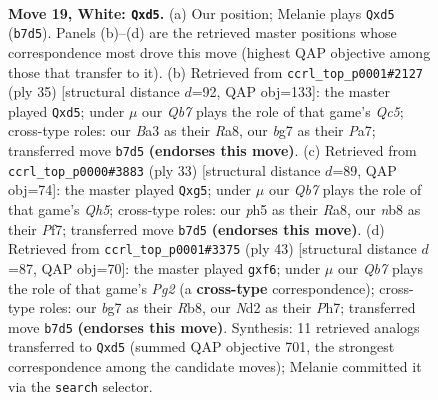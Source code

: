 \documentclass[11pt]{article}
\begin{document}
\clearpage

\begin{figure}[p]\centering
\begin{subfigure}{0.46\textwidth}\centering
\resizebox{\linewidth}{!}{%
\newchessgame
\chessboard[
  setfen={rn4kr/1Q4b1/4p3/p2q2pp/3P4/B7/P2N1PPP/R4RK1 w - - 1 19},
  showmover=false,
  pgfstyle=straightmove, color=movearrow, markmove={b7-d5}
]}
\caption{}
\end{subfigure}\hfill
\begin{subfigure}{0.46\textwidth}\centering
\resizebox{\linewidth}{!}{%
\newchessgame
\chessboard[
  setfen={r4rk1/pp1bbppp/8/3QP3/2q5/1N2B3/PPP3PP/2KR3R b - - 0 18},
  showmover=false,
  pgfstyle=straightmove, color=movearrow, markmove={c4-d5}
]}
\caption{}
\end{subfigure}
\\[4pt]
\begin{subfigure}{0.46\textwidth}\centering
\resizebox{\linewidth}{!}{%
\newchessgame
\chessboard[
  setfen={r4rk1/pp3ppp/2b5/6Q1/7q/4B3/PPP1RPP1/R5K1 b - - 2 17},
  showmover=false,
  pgfstyle=straightmove, color=movearrow, markmove={h4-g5}
]}
\caption{}
\end{subfigure}\hfill
\begin{subfigure}{0.46\textwidth}\centering
\resizebox{\linewidth}{!}{%
\newchessgame
\chessboard[
  setfen={1r3rk1/2p2ppp/B1n1pQ2/8/8/1b4P1/1P2PP1P/R1R3K1 b - - 0 22},
  showmover=false,
  pgfstyle=straightmove, color=movearrow, markmove={g7-f6}
]}
\caption{}
\end{subfigure}
\caption{\textbf{Move 19, White: \texttt{Qxd5}.} (a) Our position; Melanie plays \texttt{Qxd5} (\texttt{b7d5}). Panels (b)--(d) are the retrieved master positions whose correspondence most drove this move (highest QAP objective among those that transfer to it). (b) Retrieved from \texttt{ccrl\_top\_p0001\#2127} (ply 35) [structural distance $d$=92, QAP obj=133]: the master played \texttt{Qxd5}; under $\mu$ our \emph{Qb7} plays the role of that game's \emph{Qc5}; cross-type roles: our \emph{B}a3 as their \emph{R}a8, our \emph{b}g7 as their \emph{P}a7; transferred move \texttt{b7d5} \textbf{(endorses this move)}. (c) Retrieved from \texttt{ccrl\_top\_p0000\#3883} (ply 33) [structural distance $d$=89, QAP obj=74]: the master played \texttt{Qxg5}; under $\mu$ our \emph{Qb7} plays the role of that game's \emph{Qh5}; cross-type roles: our \emph{p}h5 as their \emph{R}a8, our \emph{n}b8 as their \emph{P}f7; transferred move \texttt{b7d5} \textbf{(endorses this move)}. (d) Retrieved from \texttt{ccrl\_top\_p0001\#3375} (ply 43) [structural distance $d$=87, QAP obj=70]: the master played \texttt{gxf6}; under $\mu$ our \emph{Qb7} plays the role of that game's \emph{Pg2} (a \textbf{cross-type} correspondence); cross-type roles: our \emph{b}g7 as their \emph{R}b8, our \emph{N}d2 as their \emph{P}h7; transferred move \texttt{b7d5} \textbf{(endorses this move)}. Synthesis: 11 retrieved analogs transferred to \texttt{Qxd5} (summed QAP objective 701, the strongest correspondence among the candidate moves); Melanie committed it via the \texttt{search} selector.}
\label{fig:thought-m36}
\end{figure}
\end{document}
